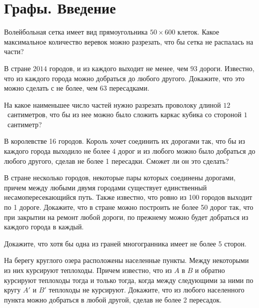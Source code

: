 

\section*{Графы. Введение}


\begin{problems}

\item
Волейбольная сетка имеет вид прямоугольника $50 \times 600$ клеток.
Какое максимальное количество веревок можно разрезать, что бы сетка не
распалась на части?

\item
В стране $2014$ городов, и из каждого выходит не менее, чем $93$ дороги.
Известно, что из каждого города можно добраться до любого другого.
Докажите, что это можно сделать с не более, чем $63$ пересадками.

\item
На какое наименьшее число частей нужно разрезать проволоку длиной
$12$~сантиметров, что бы из нее можно было сложить каркас кубика со стороной
$1$~сантиметр?

\item
В королевстве 16 городов.
Король хочет соединить их дорогами так, что бы из каждого города выходило не
более 4 дорог и из любого можно было добраться до любого другого, сделав не
более 1 пересадки.
Сможет ли он это сделать?

\item
В стране несколько городов, некоторые пары которых соединены дорогами, причем
между любыми двумя городами существует единственный несамопересекающийся путь.
Также известно, что ровно из 100 городов выходит по 1 дороге.
Докажите, что в стране можно построить не более 50 дорог так, что при закрытии
на ремонт любой дороги, по прежнему можно будет добраться из каждого города в
каждый.

\item
Докажите, что хотя бы одна из граней многогранника имеет не более 5 сторон.

\item
На берегу круглого озера расположены населенные пункты.
Между некоторыми из них курсируют теплоходы.
Причем известно, что из $A$ в $B$ и обратно курсируют теплоходы тогда и только
тогда, когда между следующими за ними по кругу $A'$ и $B'$ теплоходы не
курсируют.
Докажите, что из любого населенного пункта можно добраться в любой другой,
сделав не более 2 пересадок.

\end{problems}

